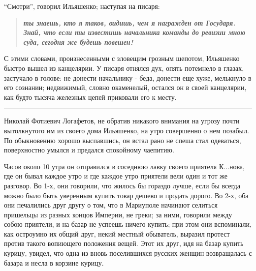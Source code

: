 \documentclass[a4paper,20pt]{report}
\begin{document}
``Смотри'', говорил Ильяшенко; наступая на писаря:
\begin{quote}
\em\bfseries	
ты знаешь, кто я таков, видишь, чем я награжден от
Государя. Знай, что если ты известишь начальника команды до ревизии мною суда,
сегодня же будешь повешен!
\end{quote}

С этими словами, произнесенными с зловещим грозным шепотом, Ильяшенко быстро
вышел из канцелярии.  У писаря отнялся дух, опять потемнело в глазах, застучало
в голове: не донести начальнику - беда, донести еще хуже, мелькнуло в его
сознании; недвижимый, словно окаменелый, остался он в своей канцелярии, как
будто тысяча железных цепей приковали его к месту.

\par\noindent\rule{\textwidth}{0.4pt}

Николай Фотиевич Логафетов, не обратив никакого внимания на угрозу почти
вытолкнутого им из своего дома Ильяшенко, на утро совершенно о нем позабыл. 
По обыкновению хорошо выспавшись, он встал рано не спеша стал одеваться, поверхностно 
умылся и предался спокойному чаепитию.

Часов около 10 утра он отправился в соседнюю лавку своего приятеля К...нова, где он бывал каждое утро
и где каждое утро приятели вели один и тот же разговор.
Во 1-х, они говорили, что жилось бы гораздо лучше, если
бы всегда можно было быть уверенным купить товар дешево и продать дорого. Во
2-х, оба они печалились друг другу о том, что в Мариуполе начинают селиться пришельцы из разных концов Империи, не греки;
за ними, говорили между собою приятели, и на базар не успеешь ничего купить;
при этом они вспоминали, как остроумно их общий друг, некий местный обыватель, выразил протест 
против такого вопиющего положения вещей. Этот их
друг, идя на базар купить курицу, увидел, что одна из
вновь поселившихся русских женщин возвращалась с базара и несла в корзине курицу. 
\end{document}
